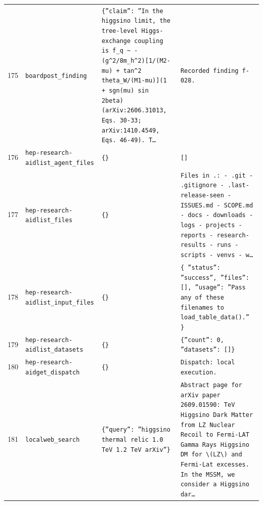 \documentclass[11pt,a4paper]{article}
\begin{document}
\begin{longtable}{@{}p{}p{}p{}p{}@{}}
175 & \texttt{board}\newline\texttt{post\_\allowbreak{}finding} & \texttt{\{''claim'':\allowbreak{} ''In the higgsino limit,\allowbreak{} the tree-level Higgs-exchange coupling is f\_\allowbreak{}q \textasciitilde{}\allowbreak{} -(g\textasciicircum{}\allowbreak{}2/\allowbreak{}8m\_\allowbreak{}h\textasciicircum{}\allowbreak{}2)\allowbreak{}[1/\allowbreak{}(M2-\textbar{}\allowbreak{}mu\textbar{}\allowbreak{})\allowbreak{} + tan\textasciicircum{}\allowbreak{}2 theta\_\allowbreak{}W/\allowbreak{}(M1-\textbar{}\allowbreak{}mu\textbar{}\allowbreak{})\allowbreak{}]\allowbreak{}(1 + sgn(mu)\allowbreak{} sin 2beta)\allowbreak{} (arXiv:\allowbreak{}2606.31013,\allowbreak{} Eqs. 30-33;\allowbreak{} arXiv:\allowbreak{}1410.4549,\allowbreak{} Eqs. 46-49)\allowbreak{}. T\ldots{}\allowbreak{}} & \texttt{Recorded finding f-028.} \\
176 & \texttt{hep-research-aid}\newline\texttt{list\_\allowbreak{}agent\_\allowbreak{}files} & \texttt{\{\}\allowbreak{}} & \texttt{[]\allowbreak{}} \\
177 & \texttt{hep-research-aid}\newline\texttt{list\_\allowbreak{}files} & \texttt{\{\}\allowbreak{}} & \texttt{Files in .:\allowbreak{}   - .git   - .gitignore   - .last-release-seen   - ISSUES.md   - SCOPE.md   - docs   - downloads   - logs   - projects   - reports   - research-results   - runs   - scripts   - venvs   - w\ldots{}\allowbreak{}} \\
178 & \texttt{hep-research-aid}\newline\texttt{list\_\allowbreak{}input\_\allowbreak{}files} & \texttt{\{\}\allowbreak{}} & \texttt{\{   ''status'':\allowbreak{} ''success'',\allowbreak{}   ''files'':\allowbreak{} []\allowbreak{},\allowbreak{}   ''usage'':\allowbreak{} ''Pass any of these filenames to load\_\allowbreak{}table\_\allowbreak{}data()\allowbreak{}.'' \}\allowbreak{}} \\
179 & \texttt{hep-research-aid}\newline\texttt{list\_\allowbreak{}datasets} & \texttt{\{\}\allowbreak{}} & \texttt{\{''count'':\allowbreak{} 0,\allowbreak{} ''datasets'':\allowbreak{} []\allowbreak{}\}\allowbreak{}} \\
180 & \texttt{hep-research-aid}\newline\texttt{get\_\allowbreak{}dispatch} & \texttt{\{\}\allowbreak{}} & \texttt{Dispatch:\allowbreak{} local execution.} \\
181 & \texttt{local}\newline\texttt{web\_\allowbreak{}search} & \texttt{\{''query'':\allowbreak{} ''higgsino thermal relic 1.0 TeV 1.2 TeV arXiv''\}\allowbreak{}} & \texttt{Abstract page for arXiv paper 2609.01590:\allowbreak{} TeV Higgsino Dark Matter from LZ Nuclear Recoil to Fermi-LAT Gamma Rays Higgsino DM for \textbackslash{}\allowbreak{}(LZ\textbackslash{}\allowbreak{})\allowbreak{} and Fermi-Lat excesses. In the MSSM,\allowbreak{} we consider a Higgsino dar\ldots{}\allowbreak{}} \\

\end{longtable}
\end{document}

